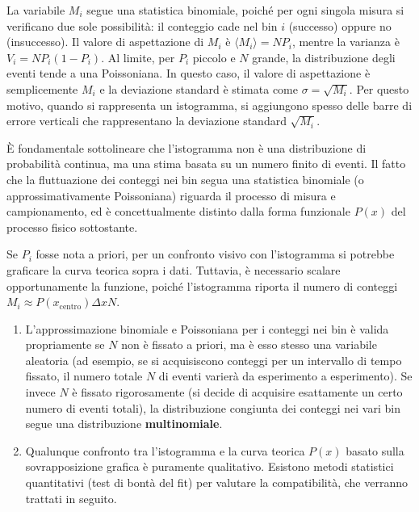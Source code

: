 \documentclass[openany,a4paper,12pt]{book}
\theoremstyle{remark}
\begin{document}
La variabile $M_i$ segue una statistica binomiale, poiché per ogni singola misura si verificano due sole possibilità: il conteggio cade nel bin $i$ (successo) oppure no (insuccesso).
Il valore di aspettazione di $M_i$ è $\langle M_i \rangle = N P_i$, mentre la varianza è $V_i = N P_i (1-P_i)$.
Al limite, per $P_i$ piccolo e $N$ grande, la distribuzione degli eventi tende a una Poissoniana. In questo caso, il valore di aspettazione è semplicemente $M_i$ e la deviazione standard è stimata come $\sigma = \sqrt{M_i}$.
Per questo motivo, quando si rappresenta un istogramma, si aggiungono spesso delle barre di errore verticali che rappresentano la deviazione standard $\sqrt{M_i}$.

È fondamentale sottolineare che l'istogramma non è una distribuzione di probabilità continua, ma una stima basata su un numero finito di eventi. Il fatto che la fluttuazione dei conteggi nei bin segua una statistica binomiale (o approssimativamente Poissoniana) riguarda il processo di misura e campionamento, ed è concettualmente distinto dalla forma funzionale $P(x)$ del processo fisico sottostante.

Se $P_i$ fosse nota a priori, per un confronto visivo con l'istogramma si potrebbe graficare la curva teorica sopra i dati. Tuttavia, è necessario scalare opportunamente la funzione, poiché l'istogramma riporta il numero di conteggi $M_i \approx P(x_{\text{centro}}) \Delta x N$.

\begin{nota}
\begin{enumerate}
    \item L'approssimazione binomiale e Poissoniana per i conteggi nei bin è valida propriamente se $N$ non è fissato a priori, ma è esso stesso una variabile aleatoria (ad esempio, se si acquisiscono conteggi per un intervallo di tempo fissato, il numero totale $N$ di eventi varierà da esperimento a esperimento). Se invece $N$ è fissato rigorosamente (si decide di acquisire esattamente un certo numero di eventi totali), la distribuzione congiunta dei conteggi nei vari bin segue una distribuzione \textbf{multinomiale}.
    \item Qualunque confronto tra l'istogramma e la curva teorica $P(x)$ basato sulla sovrapposizione grafica è puramente qualitativo. Esistono metodi statistici quantitativi (test di bontà del fit) per valutare la compatibilità, che verranno trattati in seguito.
\end{enumerate}
\end{nota}
\end{document}
